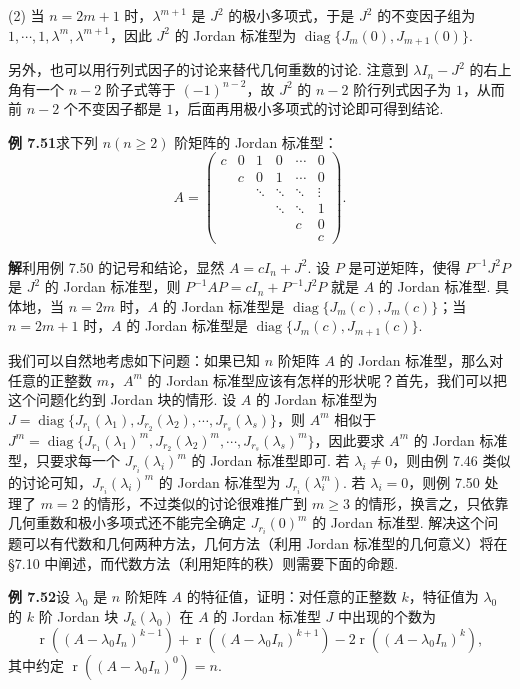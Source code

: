 \documentclass[UTF8, 12pt, fontset=fandol, oneside]{ctexart}
\begin{document}
(2) 当 $n=2m+1$ 时，$\lambda^{m+1}$ 是 $J^2$ 的极小多项式，于是 $J^2$ 的不变因子组为 $1,\cdots,1,\lambda^m,\lambda^{m+1}$，因此 $J^2$ 的 Jordan 标准型为 $\operatorname{diag}\{J_m(0),J_{m+1}(0)\}$.

另外，也可以用行列式因子的讨论来替代几何重数的讨论. 注意到 $\lambda I_n-J^2$ 的右上角有一个 $n-2$ 阶子式等于 $(-1)^{n-2}$，故 $J^2$ 的 $n-2$ 阶行列式因子为 $1$，从而前 $n-2$ 个不变因子都是 $1$，后面再用极小多项式的讨论即可得到结论.

\noindent\textbf{例 7.51}\quad 求下列 $n(n\ge 2)$ 阶矩阵的 Jordan 标准型：
\[
A=\left(\begin{array}{cccccc}
c & 0 & 1 & 0 & \cdots & 0\\
  & c & 0 & 1 & \cdots & 0\\
  &   & \ddots & \ddots & \ddots & \vdots\\
  &   &        & \ddots & \ddots & 1\\
  &   &        &        & c & 0\\
  &   &        &        &   & c
\end{array}\right).
\]

\noindent\textbf{解}\quad 利用例 7.50 的记号和结论，显然 $A=cI_n+J^2$. 设 $P$ 是可逆矩阵，使得 $P^{-1}J^2P$ 是 $J^2$ 的 Jordan 标准型，则 $P^{-1}AP=cI_n+P^{-1}J^2P$ 就是 $A$ 的 Jordan 标准型. 具体地，当 $n=2m$ 时，$A$ 的 Jordan 标准型是 $\operatorname{diag}\{J_m(c),J_m(c)\}$；当 $n=2m+1$ 时，$A$ 的 Jordan 标准型是 $\operatorname{diag}\{J_m(c),J_{m+1}(c)\}$.

我们可以自然地考虑如下问题：如果已知 $n$ 阶矩阵 $A$ 的 Jordan 标准型，那么对任意的正整数 $m$，$A^m$ 的 Jordan 标准型应该有怎样的形状呢？首先，我们可以把这个问题化约到 Jordan 块的情形. 设 $A$ 的 Jordan 标准型为 $J=\operatorname{diag}\{J_{r_1}(\lambda_1),J_{r_2}(\lambda_2),\cdots,J_{r_s}(\lambda_s)\}$，则 $A^m$ 相似于 $J^m=\operatorname{diag}\{J_{r_1}(\lambda_1)^m,J_{r_2}(\lambda_2)^m,\cdots,J_{r_s}(\lambda_s)^m\}$，因此要求 $A^m$ 的 Jordan 标准型，只要求每一个 $J_{r_i}(\lambda_i)^m$ 的 Jordan 标准型即可. 若 $\lambda_i\ne 0$，则由例 7.46 类似的讨论可知，$J_{r_i}(\lambda_i)^m$ 的 Jordan 标准型为 $J_{r_i}(\lambda_i^m)$. 若 $\lambda_i=0$，则例 7.50 处理了 $m=2$ 的情形，不过类似的讨论很难推广到 $m\ge 3$ 的情形，换言之，只依靠几何重数和极小多项式还不能完全确定 $J_{r_i}(0)^m$ 的 Jordan 标准型. 解决这个问题可以有代数和几何两种方法，几何方法（利用 Jordan 标准型的几何意义）将在 §7.10 中阐述，而代数方法（利用矩阵的秩）则需要下面的命题.

\noindent\textbf{例 7.52}\quad 设 $\lambda_0$ 是 $n$ 阶矩阵 $A$ 的特征值，证明：对任意的正整数 $k$，特征值为 $\lambda_0$ 的 $k$ 阶 Jordan 块 $J_k(\lambda_0)$ 在 $A$ 的 Jordan 标准型 $J$ 中出现的个数为
\[
\operatorname{r}((A-\lambda_0I_n)^{k-1})+\operatorname{r}((A-\lambda_0I_n)^{k+1})-2\operatorname{r}((A-\lambda_0I_n)^k),
\]
其中约定 $\operatorname{r}((A-\lambda_0I_n)^0)=n$.
\end{document}
